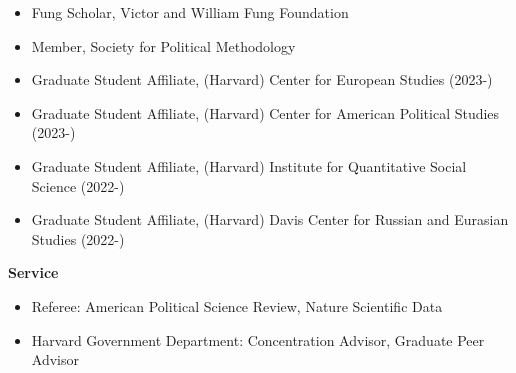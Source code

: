 \documentclass[12pt]{article}
\begin{document}
\begin{footnotesize}
\begin{itemize}[noitemsep,nolistsep]
\item Fung Scholar, Victor and William Fung Foundation

\item Member, Society for Political Methodology

\item Graduate Student Affiliate, (Harvard) Center for European Studies (2023-)

\item Graduate Student Affiliate, (Harvard) Center for American Political Studies (2023-)

\item Graduate Student Affiliate, (Harvard) Institute for Quantitative Social Science (2022-)

\item Graduate Student Affiliate, (Harvard) Davis Center for Russian and Eurasian Studies (2022-)

\end{itemize}

\vspace{5mm} 


{\bf {\normalsize Service}}

\vspace{3mm} 

\begin{itemize}[noitemsep,nolistsep]
\item Referee: American Political Science Review, Nature Scientific Data
\item Harvard Government Department: Concentration Advisor, Graduate Peer Advisor 
\end{itemize}

\end{footnotesize}
\thispagestyle{empty}
\end{document}
